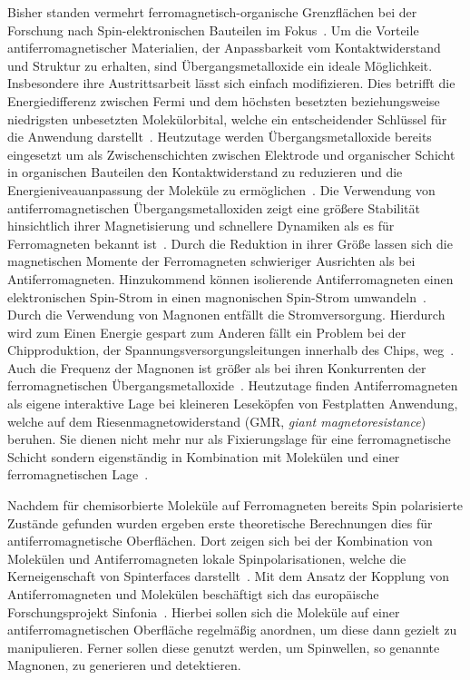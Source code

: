     Bisher standen vermehrt ferromagnetisch-organische Grenzflächen bei der Forschung nach Spin-elektronischen Bauteilen im Fokus~\cite{ma-DJ}.
    Um die Vorteile antiferromagnetischer Materialien, der Anpassbarkeit vom Kontaktwiderstand und Struktur zu erhalten, sind Übergangsmetalloxide ein ideale Möglichkeit.
    Insbesondere ihre Austrittsarbeit lässt sich einfach modifizieren.
    Dies betrifft die Energiedifferenz zwischen Fermi und dem höchsten besetzten beziehungsweise niedrigsten unbesetzten Molekülorbital, welche ein entscheidender Schlüssel für die Anwendung darstellt~\cite{5A_4}.
    Heutzutage werden Übergangsmetalloxide bereits eingesetzt um als Zwischenschichten zwischen Elektrode und organischer Schicht in organischen Bauteilen den Kontaktwiderstand zu reduzieren und die Energieniveauanpassung der Moleküle zu ermöglichen~\cite{IF_11}.
    Die Verwendung von antiferromagnetischen Übergangsmetalloxiden zeigt eine größere Stabilität hinsichtlich ihrer Magnetisierung und schnellere Dynamiken als es für Ferromagneten bekannt ist~\cite{AFM_1}.
    Durch die Reduktion in ihrer Größe lassen sich die magnetischen Momente der Ferromagneten schwieriger Ausrichten als bei Antiferromagneten.
    Hinzukommend können isolierende Antiferromagneten einen elektronischen Spin-Strom in einen magnonischen Spin-Strom umwandeln~\cite{AFM_1}.
    Durch die Verwendung von Magnonen entfällt die Stromversorgung.
    Hierdurch wird zum Einen Energie gespart zum Anderen fällt ein Problem bei der Chipproduktion, der Spannungsversorgungsleitungen innerhalb des Chips, weg~\cite{AFM_3}.
    Auch die Frequenz der Magnonen ist größer als bei ihren Konkurrenten der ferromagnetischen Übergangsmetalloxide~\cite{AFM_5}.
    Heutzutage finden Antiferromagneten als eigene interaktive Lage bei kleineren Leseköpfen von Festplatten Anwendung, welche auf dem Riesenmagnetowiderstand (GMR, \textit{giant magnetoresistance}) beruhen.
    Sie dienen nicht mehr nur als Fixierungslage für eine ferromagnetische Schicht sondern eigenständig in Kombination mit Molekülen und einer ferromagnetischen Lage~\cite{bagrets_single_2012}.

    Nachdem für chemisorbierte Moleküle auf Ferromagneten bereits Spin polarisierte Zustände gefunden wurden \cite{IF_16} ergeben erste theoretische Berechnungen dies für antiferromagnetische Oberflächen.
    Dort zeigen sich bei der Kombination von Molekülen und Antiferromagneten lokale Spinpolarisationen, welche die Kerneigenschaft von Spinterfaces darstellt~\cite{AFM_2}.
    Mit dem Ansatz der Kopplung von Antiferromagneten und Molekülen beschäftigt sich das europäische Forschungsprojekt Sinfonia~\cite{SINFONIA}.
    Hierbei sollen sich die Moleküle auf einer antiferromagnetischen Oberfläche regelmäßig anordnen, um diese dann gezielt zu manipulieren.
    Ferner sollen diese genutzt werden, um Spinwellen, so genannte Magnonen, zu generieren und detektieren.

